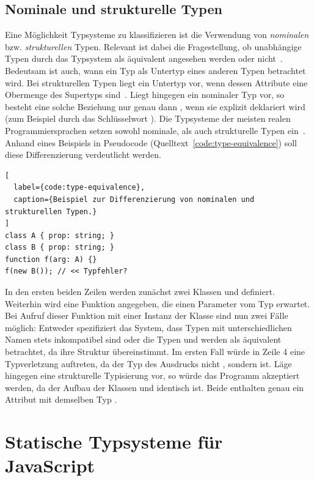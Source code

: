 \subsection{Nominale und strukturelle Typen}
Eine Möglichkeit Typsysteme zu klassifizieren ist die Verwendung von \textit{nominalen} bzw. \textit{strukturellen} Typen. Relevant ist dabei die Fragestellung, ob unabhängige Typen durch das Typsystem als äquivalent angesehen werden oder nicht~\autocite[9]{CARDELLI:TYPE_SYSTEMS}. Bedeutsam ist auch, wann ein Typ als Untertyp eines anderen Typen betrachtet wird. Bei strukturellen Typen liegt ein Untertyp vor, wenn dessen Attribute eine Obermenge des Supertyps sind~\autocite{MALAYERI:2008}. Liegt hingegen ein nominaler Typ vor, so besteht eine solche Beziehung nur genau dann , wenn sie explizit deklariert wird (zum Beispiel durch das Schlüsselwort ). Die Typsysteme der meisten realen Programmiersprachen setzen sowohl nominale, als auch strukturelle Typen ein~\autocite[9]{CARDELLI:TYPE_SYSTEMS}. Anhand eines Beispiels in Pseudocode (Quelltext~\ref{code:type-equivalence}) soll diese Differenzierung verdeutlicht werden.

\begin{lstlisting}[
  label={code:type-equivalence},
  caption={Beispiel zur Differenzierung von nominalen und strukturellen Typen.}
]
class A { prop: string; }
class B { prop: string; }
function f(arg: A) {}
f(new B()); // << Typfehler?
\end{lstlisting}

In den ersten beiden Zeilen werden zunächst zwei Klassen  und  definiert. Weiterhin wird eine Funktion  angegeben, die einen Parameter vom Typ  erwartet. Bei Aufruf dieser Funktion mit einer Instanz der Klasse  sind nun zwei Fälle möglich: Entweder spezifiziert das System, dass Typen mit unterschiedlichen Namen stets inkompatibel sind oder die Typen  und  werden als äquivalent betrachtet, da ihre Struktur übereinstimmt. Im ersten Fall würde in Zeile 4 eine Typverletzung auftreten, da der Typ des Ausdrucks  nicht , sondern  ist. Läge hingegen eine strukturelle Typisierung vor, so würde das Programm akzeptiert werden, da der Aufbau der Klassen  und  identisch ist. Beide enthalten genau ein Attribut  mit demselben Typ .

\section{Statische Typsysteme für JavaScript}
\label{sec:static-typesystems-for-js}

